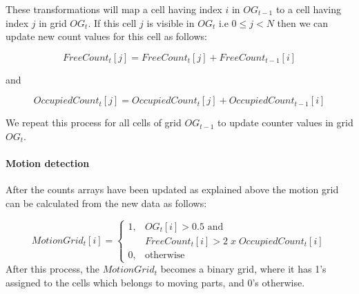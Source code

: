 

These transformations will map a cell having index $i$ in $OG_{t-1}$ to a cell having index $j$ in grid $OG_t$. If this cell $j$ is visible in $OG_t$ i.e $0 \leq j<N$ then we can update new count values for this cell as follows:

\begin{equation}
FreeCount_t[j] = FreeCount_t[j] + FreeCount_{t-1}[i]
\end{equation}

and

\begin{equation}
OccupiedCount_t[j] = OccupiedCount_t[j] + OccupiedCount_{t-1}[i]
\end{equation}

We repeat this process for all cells of grid $OG_{t-1}$ to update counter values in grid $OG_{t}$.

\paragraph{Motion detection} After the counts arrays have been updated as explained above the motion grid can be calculated from the new data as follows:

\begin{equation}
MotionGrid_t[i] = \begin{cases} 1, & \mbox{$OG_t[i] > 0.5$ and} \\ & \mbox {$FreeCount_t[i]>2\;  x \; OccupiedCount_t[i]$} \\
                                0, & \mbox{otherwise}\end{cases}
\end{equation}
After this process, the $MotionGrid_t$ becomes a binary grid, where it has 1's assigned to the cells which belongs to moving parts, and 0's otherwise.







